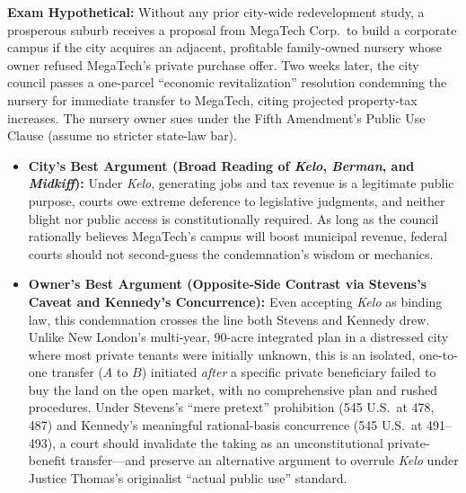 \documentclass[12pt]{article}
\begin{document}
\textbf{Exam Hypothetical:} Without any prior city-wide redevelopment study, a prosperous suburb receives a proposal from MegaTech Corp.\ to build a corporate campus if the city acquires an adjacent, profitable family-owned nursery whose owner refused MegaTech's private purchase offer. Two weeks later, the city council passes a one-parcel ``economic revitalization'' resolution condemning the nursery for immediate transfer to MegaTech, citing projected property-tax increases. The nursery owner sues under the Fifth Amendment's Public Use Clause (assume no stricter state-law bar).
\begin{itemize}
  \item \textbf{City's Best Argument (Broad Reading of \textit{Kelo}, \textit{Berman}, and \textit{Midkiff}):} Under \textit{Kelo}, generating jobs and tax revenue is a legitimate public purpose, courts owe extreme deference to legislative judgments, and neither blight nor public access is constitutionally required. As long as the council rationally believes MegaTech's campus will boost municipal revenue, federal courts should not second-guess the condemnation's wisdom or mechanics.
  \item \textbf{Owner's Best Argument (Opposite-Side Contrast via Stevens's Caveat and Kennedy's Concurrence):} Even accepting \textit{Kelo} as binding law, this condemnation crosses the line both Stevens and Kennedy drew. Unlike New London's multi-year, 90-acre integrated plan in a distressed city where most private tenants were initially unknown, this is an isolated, one-to-one transfer ($A$ to $B$) initiated \textit{after} a specific private beneficiary failed to buy the land on the open market, with no comprehensive plan and rushed procedures. Under Stevens's ``mere pretext'' prohibition (545 U.S.\ at 478, 487) and Kennedy's meaningful rational-basis concurrence (545 U.S.\ at 491--493), a court should invalidate the taking as an unconstitutional private-benefit transfer---and preserve an alternative argument to overrule \textit{Kelo} under Justice Thomas's originalist ``actual public use'' standard.
\end{itemize}
\end{document}
